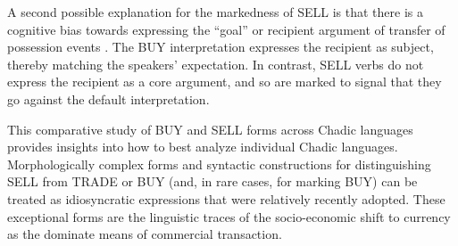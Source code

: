 A second possible explanation for the markedness of SELL is that there is a cognitive bias towards expressing the ``goal'' or recipient argument of transfer of possession events \citep{lakustaStartingEndImportance2005,georgakopoulosFramingDifferenceSources2015}. The BUY interpretation expresses the recipient as subject, thereby matching the speakers' expectation. In contrast, SELL verbs do not express the recipient as a core argument, and so are marked to signal that they go against the default interpretation. 

This comparative study of BUY and SELL forms across Chadic languages provides insights into how to best analyze individual Chadic languages. Morphologically complex forms and syntactic constructions for distinguishing SELL from TRADE or BUY (and, in rare cases, for marking BUY) can be treated as idiosyncratic expressions that were relatively recently adopted. These exceptional forms are the linguistic traces of the socio-economic shift to currency as the dominate means of commercial transaction. 
